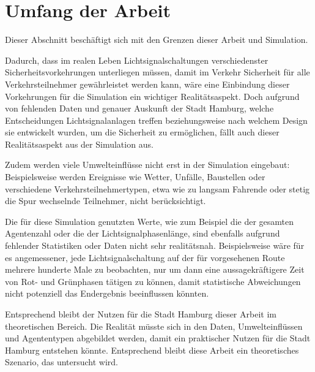 %


\section{Umfang der Arbeit}\label{sec:delimitation}

Dieser Abschnitt beschäftigt sich mit den Grenzen dieser Arbeit und Simulation.

Dadurch, dass im realen Leben Lichtsignalschaltungen verschiedenster Sicherheitsvorkehrungen unterliegen müssen, damit im Verkehr Sicherheit für alle Verkehrsteilnehmer gewährleistet werden kann, wäre eine Einbindung dieser Vorkehrungen für die Simulation ein wichtiger Realitätsaspekt.
Doch aufgrund von fehlenden Daten und genauer Auskunft der Stadt Hamburg, welche Entscheidungen Lichtsignalanlagen treffen beziehungsweise nach welchem Design sie entwickelt wurden, um die Sicherheit zu ermöglichen, fällt auch dieser Realitätsaspekt aus der Simulation aus.

Zudem werden viele Umwelteinflüsse nicht erst in der Simulation eingebaut: Beispielsweise werden Ereignisse wie Wetter, Unfälle, Baustellen oder verschiedene Verkehrsteilnehmertypen, etwa wie zu langsam Fahrende oder stetig die Spur wechselnde Teilnehmer, nicht berücksichtigt.

Die für diese Simulation genutzten Werte, wie zum Beispiel die der gesamten Agentenzahl oder die der Lichtsignalphasenlänge, sind ebenfalls aufgrund fehlender Statistiken oder Daten nicht sehr realitätsnah.
Beispielsweise wäre für es angemessener, jede Lichtsignalschaltung auf der für  vorgesehenen Route mehrere hunderte Male zu beobachten, nur um dann eine aussagekräftigere Zeit von Rot- und Grünphasen tätigen zu können, damit statistische Abweichungen nicht potenziell das Endergebnis beeinflussen könnten.

Entsprechend bleibt der Nutzen für die Stadt Hamburg dieser Arbeit im theoretischen Bereich.
Die Realität müsste sich in den Daten, Umwelteinflüssen und Agententypen abgebildet werden, damit ein praktischer Nutzen für die Stadt Hamburg entstehen könnte.
Entsprechend bleibt diese Arbeit ein theoretisches Szenario, das untersucht wird.
